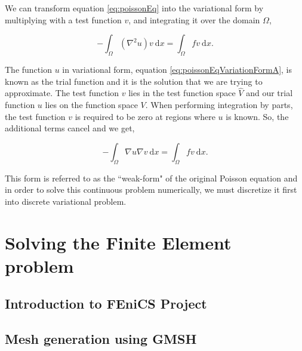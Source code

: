 We can transform equation \ref{eq:poissonEq} into the variational form by multiplying with a test function $v$, and integrating it over the domain $\Omega$,


	\begin{equation}
	- \int_{\Omega} \left(\nabla^2 u\right)v\ \mathrm{d}x= \int_{\Omega} fv\ \mathrm{d}x.
	\label{eq:poissonEqVariationFormA}
	\end{equation}

The function $u$ in variational form, equation \ref{eq:poissonEqVariationFormA}, is known as the trial function and it is the solution that we are trying to approximate. The test function $v$ lies in the test function space $\hat{V}$ and our trial function $u$ lies on the function space $V$. When performing integration by parts, the test function $v$ is required to be zero at regions where $u$ is known. So, the additional terms cancel and we get,

	\begin{equation}
	- \int_{\Omega} \nabla u \nabla v\ \mathrm{d}x= \int_{\Omega} fv\ \mathrm{d}x.
	\label{eq:poissonEqVariationFormB}
	\end{equation}

This form is referred to as the ``weak-form" of the original Poisson equation and in order to solve this continuous problem numerically, we must discretize it first into discrete variational problem.


\section{Solving the Finite Element problem}

\subsection{Introduction to FEniCS Project}

\subsection{Mesh generation using GMSH}


